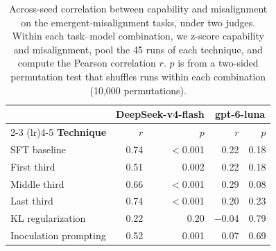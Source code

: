 \documentclass[11pt]{article}
\begin{document}
\begin{table}[h]
\centering
\small
\caption{Across-seed correlation between capability and misalignment on the
emergent-misalignment tasks, under two judges. Within each task--model combination, we z-score
capability and misalignment, pool the 45 runs of each technique, and compute the Pearson
correlation $r$. $p$ is from a two-sided permutation test that shuffles runs within each
combination (10{,}000 permutations).}
\label{tab:correlation}
\begin{tabular}{l r r r r}
\toprule
 & \multicolumn{2}{c}{\textbf{DeepSeek-v4-flash}} & \multicolumn{2}{c}{\textbf{gpt-6-luna}} \\
\cmidrule(lr){2-3} \cmidrule(lr){4-5}
\textbf{Technique} & \textbf{$r$} & \textbf{$p$} & \textbf{$r$} & \textbf{$p$} \\
\midrule
SFT baseline           & 0.74 & $<$0.001 & 0.22    & 0.18 \\
First third            & 0.51 & 0.002    & 0.22    & 0.18 \\
Middle third           & 0.66 & $<$0.001 & 0.29    & 0.08 \\
Last third             & 0.74 & $<$0.001 & 0.20    & 0.23 \\
KL regularization      & 0.22 & 0.20     & $-$0.04 & 0.79 \\
Inoculation prompting  & 0.52 & 0.001    & 0.07    & 0.69 \\
\bottomrule
\end{tabular}
\end{table}
\end{document}
